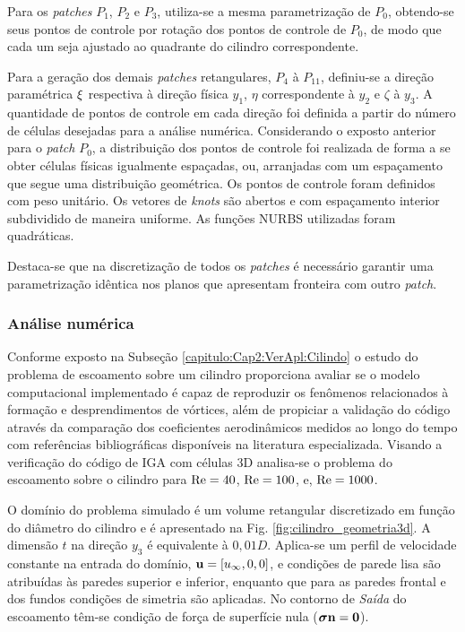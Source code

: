 \documentclass[tese_patricia]{subfiles}
\begin{document}
Para os \textit{patches} $P_1$, $P_2$ e $P_3$, utiliza-se a mesma parametrização de $P_0$, obtendo-se seus pontos de controle por rotação dos pontos de controle de $P_0$, de modo que cada um seja ajustado ao quadrante do cilindro correspondente.

Para a geração dos demais \textit{patches} retangulares, $P_4$ à $P_{11}$, definiu-se a direção paramétrica $\xi$ respectiva à direção física $y_1$, $\eta$ correspondente à $y_2$ e $\zeta$ à $y_3$. A quantidade de pontos de controle em cada direção foi definida a partir do número de células desejadas para a análise numérica. Considerando o exposto anterior para o \textit{patch} $P_0$, a distribuição dos pontos de controle foi realizada de forma a se obter células físicas igualmente espaçadas, ou, arranjadas com um espaçamento que segue uma distribuição geométrica. Os pontos de controle foram definidos com peso unitário. Os vetores de \textit{knots} são abertos e com espaçamento interior subdividido de maneira uniforme. As funções NURBS utilizadas foram quadráticas. 

Destaca-se que na discretização de todos os \textit{patches} é necessário garantir uma parametrização idêntica nos planos que apresentam fronteira com outro \textit{patch}.


\subsubsection {Análise numérica}


Conforme exposto na Subseção \ref{capitulo:Cap2:VerApl:Cilindo} o estudo do problema de escoamento sobre um cilindro proporciona avaliar se o modelo computacional implementado é capaz de reproduzir os fenômenos relacionados à formação e desprendimentos de vórtices, além de propiciar a validação do código através da comparação dos coeficientes aerodinâmicos medidos ao longo do tempo com referências bibliográficas disponíveis na literatura especializada. Visando a verificação do código de IGA com células 3D analisa-se o problema do escoamento sobre o cilindro para $\mathrm{Re} = 40$, $\mathrm{Re} = 100$, e, $\mathrm{Re} = 1000$.

O domínio do problema simulado é um volume retangular discretizado em função do diâmetro do cilindro e é apresentado na Fig. \ref{fig:cilindro_geometria3d}. A dimensão $t$ na direção $y_3$ é equivalente à $0,01D$. Aplica-se um perfil de velocidade constante na entrada do domínio, $\mathbf{u}=[u_\infty,0,0]$, e condições de parede lisa são atribuídas às paredes superior e inferior, enquanto que para as paredes frontal e dos fundos condições de simetria são aplicadas. No contorno de \textit{Saída} do escoamento têm-se condição de força de superfície nula ($\boldsymbol{\sigma} \mathbf{n} = \mathbf{0}$).
\end{document}
